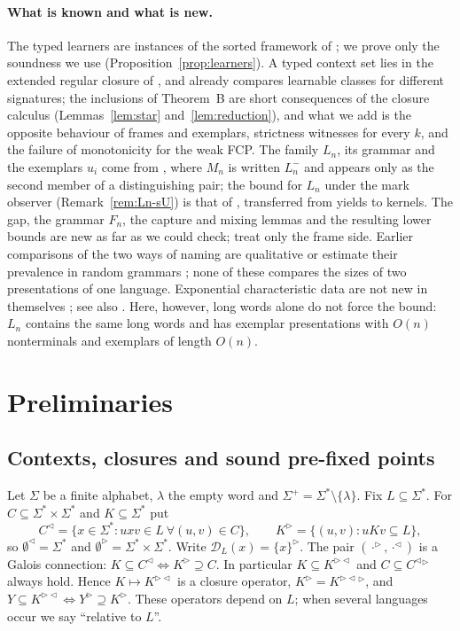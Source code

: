 \documentclass[11pt]{article}
\numberwithin{equation}{section}
\theoremstyle{plain}
\theoremstyle{definition}
\theoremstyle{remark}
\theoremstyle{plain}
\newcommand{\eps}{\lambda}
\newcommand{\R}{^{\rhd}}
\newcommand{\Lc}{^{\lhd}}
\newcommand{\RL}{^{\rhd\lhd}}
\newcommand{\D}{\mathcal D}
\begin{document}
\paragraph{What is known and what is new.}
The typed learners are instances of the sorted framework of
\citet{yoshinaka2015}; we prove only the soundness we use
(Proposition~\ref{prop:learners}).  A typed context set lies in the
extended regular closure of \citet{ky2023}, and
\citet[Sec.~8]{yoshinaka2015} already compares learnable classes for
different signatures; the inclusions of Theorem~B are short consequences
of the closure calculus (Lemmas~\ref{lem:star} and~\ref{lem:reduction}), and
what we add is the opposite behaviour of frames and exemplars, strictness
witnesses for every $k$, and the failure of monotonicity for the weak FCP.
The family $L_n$, its grammar and the exemplars $u_i$ come from
\citet[Sec.~6]{kuriyama-tcs1}, where $M_n$ is written $L_n^-$ and appears
only as the second member of a distinguishing pair; the bound for $L_n$
under the mark observer (Remark~\ref{rem:Ln-sU}) is that of
\citet[Eq.~($\spadesuit$), Cor.~6.6]{kuriyama-tcs1}, transferred from
yields to kernels.  The gap, the grammar $F_n$, the capture and mixing lemmas and the
resulting lower bounds are new as far as we could check; \citet{ky2023}
treat only the frame side.  Earlier comparisons of the two ways of naming
are qualitative \citep{yoshinaka2011dlt,yoshinaka2012lata,ky2021} or estimate
their prevalence in random grammars \citep{clark2016icgi}; none of these
compares the sizes of two presentations of one language.  Exponential characteristic data are not new in
themselves \citep[Example~2]{clark-eyraud2007}; see also
\citet{coste-nicolas2019}.  Here, however, long words alone do not force
the bound: $L_n$ contains the same long words and has exemplar
presentations with $O(n)$ nonterminals and exemplars of length $O(n)$.


\section{Preliminaries}\label{sec:prelim}

\subsection*{Contexts, closures and sound pre-fixed points}
Let $\Sigma$ be a finite alphabet, $\eps$ the empty word and
$\Sigma^+=\Sigma^*\setminus\{\eps\}$.  Fix $L\subseteq\Sigma^*$.
For $C\subseteq\Sigma^*\times\Sigma^*$ and $K\subseteq\Sigma^*$ put
\[
C\Lc=\{x\in\Sigma^*: uxv\in L\ \forall(u,v)\in C\},\qquad
K\R=\{(u,v): uKv\subseteq L\},
\]
so $\emptyset\Lc=\Sigma^*$ and $\emptyset\R=\Sigma^*\times\Sigma^*$.
Write $\D_L(x)=\{x\}\R$.  The pair $(\cdot\R,\cdot\Lc)$ is a Galois
connection: $K\subseteq C\Lc\iff K\R\supseteq C$.  In particular
$K\subseteq K\RL$ and $C\subseteq C\Lc{}\R$ always hold.  Hence $K\mapsto K\RL$
is a closure operator, $K\R=K\RL{}\R$, and $Y\subseteq K\RL\iff Y\R\supseteq K\R$.
These operators depend on $L$; when several languages occur we say
``relative to $L$''.
\end{document}

